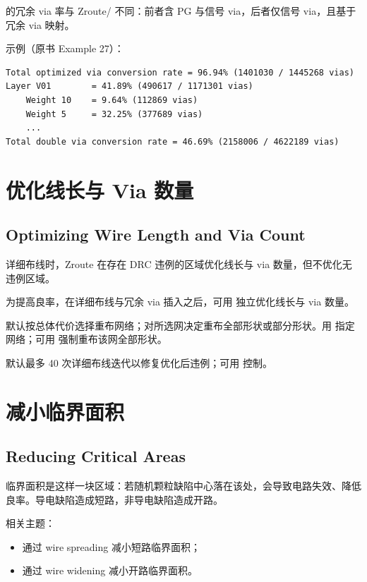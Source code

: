 \begin{noteBox}
 的冗余 via 率与 Zroute/ 不同：前者含 PG 与信号 via，后者仅信号 via，且基于冗余 via 映射。
\end{noteBox}

示例（原书 Example 27）：
\begin{lstlisting}
Total optimized via conversion rate = 96.94% (1401030 / 1445268 vias)
Layer V01        = 41.89% (490617 / 1171301 vias)
    Weight 10    = 9.64% (112869 vias)
    Weight 5     = 32.25% (377689 vias)
    ...
Total double via conversion rate = 46.69% (2158006 / 4622189 vias)
\end{lstlisting}

\section{优化线长与 Via 数量}
\subsection*{Optimizing Wire Length and Via Count}

详细布线时，Zroute 在存在 DRC 违例的区域优化线长与 via 数量，但不优化无违例区域。

为提高良率，在详细布线与冗余 via 插入之后，可用  独立优化线长与 via 数量。

默认按总体代价选择重布网络；对所选网决定重布全部形状或部分形状。用  指定网络；可用  强制重布该网全部形状。

默认最多 40 次详细布线迭代以修复优化后违例；可用  控制。

\section{减小临界面积}
\subsection*{Reducing Critical Areas}

临界面积是这样一块区域：若随机颗粒缺陷中心落在该处，会导致电路失效、降低良率。导电缺陷造成短路，非导电缺陷造成开路。

相关主题：
\begin{itemize}
  \item 通过 wire spreading 减小短路临界面积；
  \item 通过 wire widening 减小开路临界面积。
\end{itemize}

